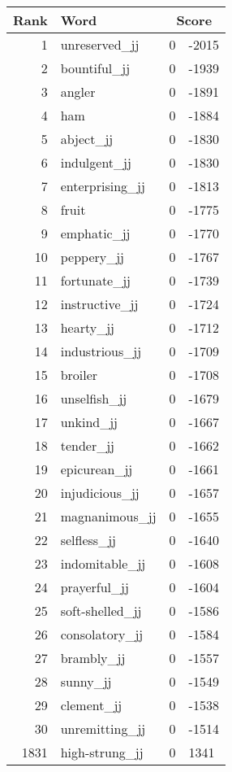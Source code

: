 \begin{longtable}[!htbp]{| rlr@{.}l |}
    \hline
    \textbf{Rank} & \textbf{Word} & \multicolumn{2}{c|}{\textbf{Score}} \\
    \hline
    \endhead
    1 & unreserved\_jj & 0 & -2015 \\
    2 & bountiful\_jj & 0 & -1939 \\
    3 & angler & 0 & -1891 \\
    4 & ham & 0 & -1884 \\
    5 & abject\_jj & 0 & -1830 \\
    6 & indulgent\_jj & 0 & -1830 \\
    7 & enterprising\_jj & 0 & -1813 \\
    8 & fruit & 0 & -1775 \\
    9 & emphatic\_jj & 0 & -1770 \\
    10 & peppery\_jj & 0 & -1767 \\
    11 & fortunate\_jj & 0 & -1739 \\
    12 & instructive\_jj & 0 & -1724 \\
    13 & hearty\_jj & 0 & -1712 \\
    14 & industrious\_jj & 0 & -1709 \\
    15 & broiler & 0 & -1708 \\
    16 & unselfish\_jj & 0 & -1679 \\
    17 & unkind\_jj & 0 & -1667 \\
    18 & tender\_jj & 0 & -1662 \\
    19 & epicurean\_jj & 0 & -1661 \\
    20 & injudicious\_jj & 0 & -1657 \\
    21 & magnanimous\_jj & 0 & -1655 \\
    22 & selfless\_jj & 0 & -1640 \\
    23 & indomitable\_jj & 0 & -1608 \\
    24 & prayerful\_jj & 0 & -1604 \\
    25 & soft-shelled\_jj & 0 & -1586 \\
    26 & consolatory\_jj & 0 & -1584 \\
    27 & brambly\_jj & 0 & -1557 \\
    28 & sunny\_jj & 0 & -1549 \\
    29 & clement\_jj & 0 & -1538 \\
    30 & unremitting\_jj & 0 & -1514 \\
    1831 & high-strung\_jj & 0 & 1341 \\

\end{longtable}
